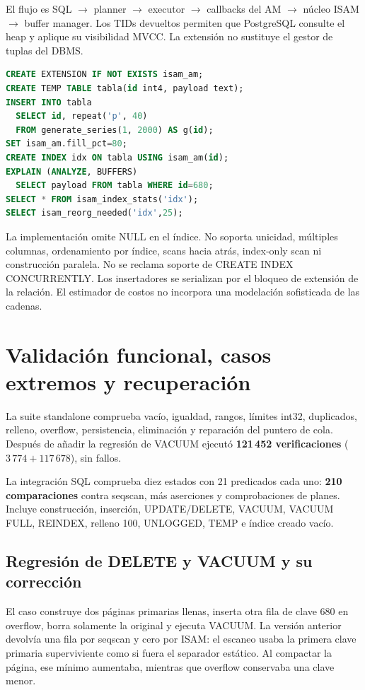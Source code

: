 \documentclass[11pt,a4paper]{article}
\newcommand{\code}[1]{\texttt{\detokenize{#1}}}
\begin{document}
El flujo es SQL $\rightarrow$ planner $\rightarrow$ executor $\rightarrow$
callbacks del AM $\rightarrow$ núcleo ISAM $\rightarrow$ buffer manager.
Los TIDs devueltos permiten que PostgreSQL consulte el heap y aplique su
visibilidad MVCC. La extensión no sustituye el gestor de tuplas del DBMS.

\begin{lstlisting}[language=SQL,caption={Uso del método de acceso real}]
CREATE EXTENSION IF NOT EXISTS isam_am;
CREATE TEMP TABLE tabla(id int4, payload text);
INSERT INTO tabla
  SELECT id, repeat('p', 40)
  FROM generate_series(1, 2000) AS g(id);
SET isam_am.fill_pct=80;
CREATE INDEX idx ON tabla USING isam_am(id);
EXPLAIN (ANALYZE, BUFFERS)
  SELECT payload FROM tabla WHERE id=680;
SELECT * FROM isam_index_stats('idx');
SELECT isam_reorg_needed('idx',25);
\end{lstlisting}

La implementación omite NULL en el índice. No soporta unicidad, múltiples
columnas, ordenamiento por índice, scans hacia atrás, index-only scan ni
construcción paralela. No se reclama soporte de CREATE INDEX CONCURRENTLY. Los
insertadores se serializan por el bloqueo de extensión de la relación. El
estimador de costos no incorpora una modelación sofisticada de las cadenas.

\section{Validación funcional, casos extremos y recuperación}

La suite standalone comprueba vacío, igualdad, rangos, límites int32, duplicados,
relleno, overflow, persistencia, eliminación y reparación del puntero de cola.
Después de añadir la regresión de VACUUM ejecutó \textbf{121\,452 verificaciones}
($3\,774 + 117\,678$), sin fallos.

La integración SQL comprueba diez estados con 21 predicados cada uno:
\textbf{210 comparaciones} contra seqscan, más aserciones y comprobaciones de
planes. Incluye construcción, inserción, UPDATE/DELETE, VACUUM, VACUUM FULL,
REINDEX, relleno 100, UNLOGGED, TEMP e índice creado vacío.

\subsection{Regresión de DELETE y VACUUM y su corrección}

El caso \code{tests/sql/caso-vacuum.sql} construye dos páginas primarias llenas,
inserta otra fila de clave 680 en overflow, borra solamente la original y ejecuta
VACUUM. La versión anterior devolvía una fila por seqscan y cero por ISAM: el
escaneo usaba la primera clave primaria superviviente como si fuera el separador
estático. Al compactar la página, ese mínimo aumentaba, mientras que overflow
conservaba una clave menor.
\end{document}

